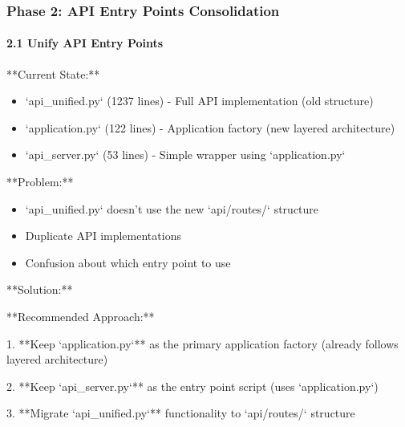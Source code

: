 \documentclass[11pt,a4paper]{article}
\begin{document}
\subsubsection{Phase 2: API Entry Points Consolidation}

\paragraph{2.1 Unify API Entry Points}

**Current State:**

\begin{itemize}
\item `api_unified.py` (1237 lines) - Full API implementation (old structure)
\end{itemize}

\begin{itemize}
\item `application.py` (122 lines) - Application factory (new layered architecture)
\end{itemize}

\begin{itemize}
\item `api_server.py` (53 lines) - Simple wrapper using `application.py`
\end{itemize}

**Problem:**

\begin{itemize}
\item `api_unified.py` doesn't use the new `api/routes/` structure
\end{itemize}

\begin{itemize}
\item Duplicate API implementations
\end{itemize}

\begin{itemize}
\item Confusion about which entry point to use
\end{itemize}

**Solution:**

**Recommended Approach:**

1. **Keep `application.py`** as the primary application factory (already follows layered architecture)

2. **Keep `api\_server.py`** as the entry point script (uses `application.py`)

3. **Migrate `api\_unified.py`** functionality to `api/routes/` structure
\end{document}
